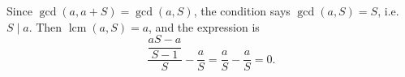 Since $\gcd(a,a+S)=\gcd(a,S)$, the condition says $\gcd(a,S)=S$, i.e. $S\mid a$. Then $\operatorname{lcm}(a,S)=a$, and the expression is
\[\dfrac{\dfrac{aS-a}{S-1}}S-\dfrac aS=\dfrac aS-\dfrac aS=\boxed{0}.\]
